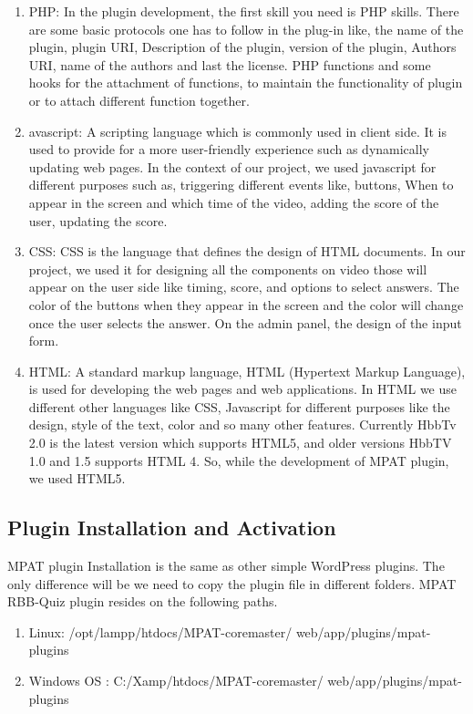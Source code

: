\begin{enumerate}
  \item PHP: 
In the plugin development, the first skill you need is PHP
skills. There are some basic protocols one has to follow in the
plug-in like, the name of the plugin, plugin URI, Description
of the plugin, version of the plugin, Authors URI, name of the
authors and last the license. PHP functions and some hooks
for the attachment of functions, to maintain the functionality
of plugin or to attach different function together.
 \item avascript: 
A scripting language which is commonly used in client side.
It is used to provide for a more user-friendly experience such
as dynamically updating web pages.
In the context of our project, we used javascript for different
purposes such as, triggering different events like, buttons,
When to appear in the screen and which time of the video,
adding the score of the user, updating the score.
 \item CSS: 
CSS is the language that defines the design of HTML
documents. In our project, we used it for designing all the
components on video those will appear on the user side like
timing, score, and options to select answers. The color of the
buttons when they appear in the screen and the color will
change once the user selects the answer. On the admin panel,
the design of the input form.
 \item  HTML: 
A standard markup language, HTML (Hypertext Markup
Language), is used for developing the web pages and web
applications. In HTML we use different other languages like
CSS, Javascript for different purposes like the design, style of
the text, color and so many other features.
Currently HbbTv 2.0 is the latest version which supports
HTML5, and older versions HbbTV 1.0 and 1.5 supports
HTML 4. So, while the development of MPAT plugin, we
used HTML5.
\end{enumerate}


\subsection{Plugin Installation and Activation}


MPAT plugin Installation is the same as other simple
WordPress plugins. The only difference will be we need to
copy the plugin file in different folders. MPAT RBB-Quiz
plugin resides on the following paths.


\begin{enumerate}
\item Linux: /opt/lampp/htdocs/MPAT-coremaster/
web/app/plugins/mpat-plugins
\item Windows OS : C:/Xamp/htdocs/MPAT-coremaster/
web/app/plugins/mpat-plugins
\end{enumerate}


